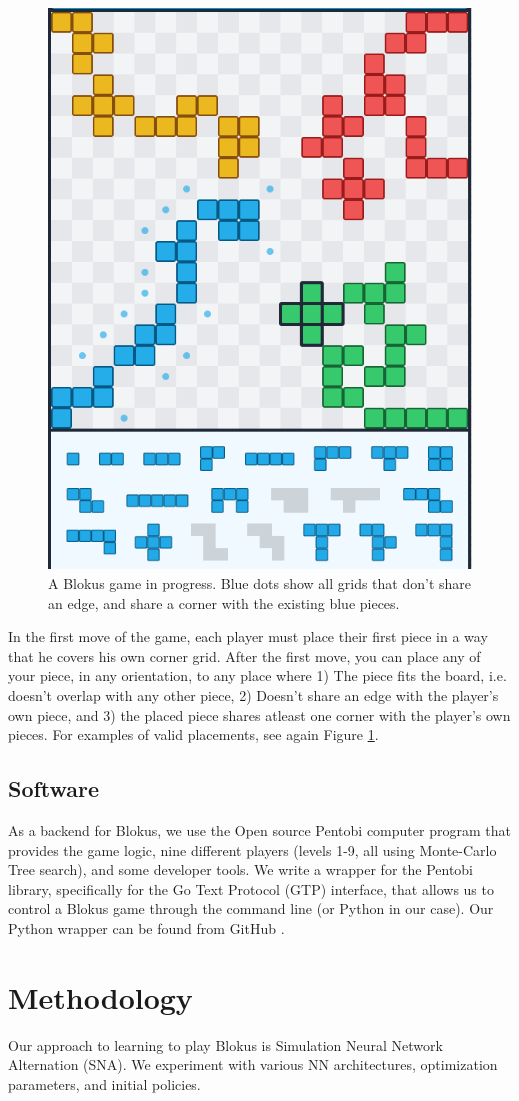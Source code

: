 \documentclass{article}
\begin{document}
\begin{figure}[h]
    \centering
    \includegraphics[width=0.4\linewidth]{blokus_board.png}
    \caption{A Blokus game in progress. Blue dots show all grids that don't share an edge, and share a corner with the existing blue pieces.}
    \label{fig:blokus_board}
\end{figure}


In the first move of the game, each player must place their first piece in a way that he covers his own corner grid. After the first move, you can place any of your piece, in any orientation, to any place where 1) The piece fits the board, i.e. doesn't overlap with any other piece, 2) Doesn't share an edge with the player's own piece, and 3) the placed piece shares atleast one corner with the player's own pieces. For examples of valid placements, see again Figure \ref{fig:blokus_board}.

\subsection{Software}
As a backend for Blokus, we use the Open source Pentobi \cite{Enzenberger2011Pentobi} computer program that provides the game logic, nine different players (levels 1-9, all using Monte-Carlo Tree search), and some developer tools. We write a wrapper for the Pentobi library, specifically for the Go Text Protocol (GTP) interface, that allows us to control a Blokus game through the command line (or Python in our case). Our Python wrapper can be found from GitHub \cite{Vahteristo2024PythonBlokus}.


\section{Methodology}

Our approach to learning to play Blokus is Simulation Neural Network Alternation (SNA). We experiment with various NN architectures, optimization parameters, and initial policies.
\end{document}

